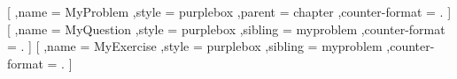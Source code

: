         [
            ,name = MyProblem
            ,style = purplebox
            ,parent = chapter
            ,counter-format = .
        ]
        [
            ,name = MyQuestion
            ,style = purplebox
            ,sibling = myproblem
            ,counter-format = .
        ]
        [
            ,name = MyExercise
            ,style = purplebox
            ,sibling = myproblem
            ,counter-format = .
        ]
